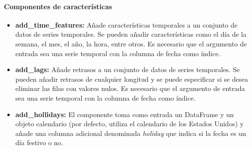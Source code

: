 \paragraph{Componentes de características}
\begin{itemize}
    \item \textbf{add\_time\_features:} Añade características temporales a un conjunto de datos
    de series temporales. Se pueden añadir características como el día de la semana, el mes, el año,
    la hora, entre otros. Es necesario que el argumento de entrada sea una serie temporal con la
    columna de fecha como índice.
    \item \textbf{add\_lags:} Añade retrasos a un conjunto de datos de series temporales. Se pueden
    añadir retrasos de cualquier longitud y se puede especificar si se desea eliminar las filas con
    valores nulos. Es necesario que el argumento de entrada sea una serie temporal con la columna de
    fecha como índice.
    \item \textbf{add\_hollidays:} El componente toma como entrada un DataFrame y un objeto 
    calendario (por defecto, utiliza el calendario de los Estados Unidos) y 
    añade una columna adicional denominada \textit{holiday} que indica si la fecha es un día festivo
    o no.
\end{itemize}


